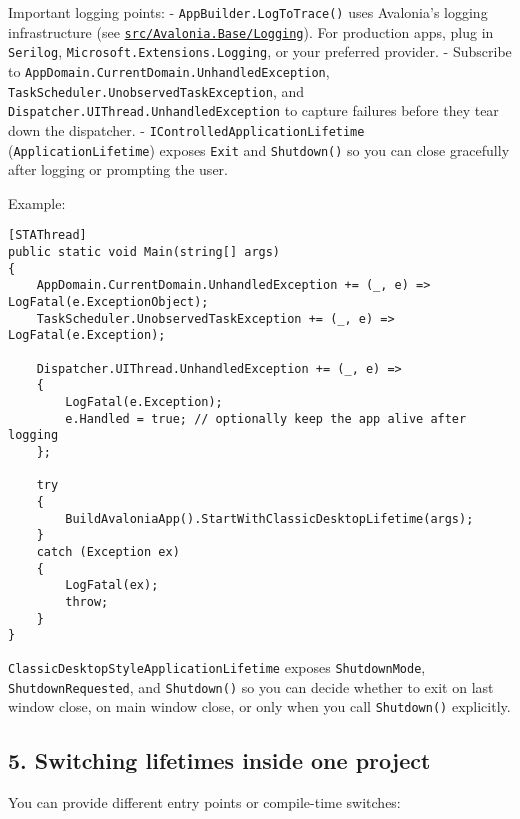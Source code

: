 Important logging points: -
\passthrough{\lstinline!AppBuilder.LogToTrace()!} uses Avalonia's
logging infrastructure (see
\href{https://github.com/AvaloniaUI/Avalonia/tree/master/src/Avalonia.Base/Logging}{\passthrough{\lstinline!src/Avalonia.Base/Logging!}}).
For production apps, plug in \passthrough{\lstinline!Serilog!},
\passthrough{\lstinline!Microsoft.Extensions.Logging!}, or your
preferred provider. - Subscribe to
\passthrough{\lstinline!AppDomain.CurrentDomain.UnhandledException!},
\passthrough{\lstinline!TaskScheduler.UnobservedTaskException!}, and
\passthrough{\lstinline!Dispatcher.UIThread.UnhandledException!} to
capture failures before they tear down the dispatcher. -
\passthrough{\lstinline!IControlledApplicationLifetime!}
(\passthrough{\lstinline!ApplicationLifetime!}) exposes
\passthrough{\lstinline!Exit!} and \passthrough{\lstinline!Shutdown()!}
so you can close gracefully after logging or prompting the user.

Example:

\begin{lstlisting}
[STAThread]
public static void Main(string[] args)
{
    AppDomain.CurrentDomain.UnhandledException += (_, e) => LogFatal(e.ExceptionObject);
    TaskScheduler.UnobservedTaskException += (_, e) => LogFatal(e.Exception);

    Dispatcher.UIThread.UnhandledException += (_, e) =>
    {
        LogFatal(e.Exception);
        e.Handled = true; // optionally keep the app alive after logging
    };

    try
    {
        BuildAvaloniaApp().StartWithClassicDesktopLifetime(args);
    }
    catch (Exception ex)
    {
        LogFatal(ex);
        throw;
    }
}
\end{lstlisting}

\passthrough{\lstinline!ClassicDesktopStyleApplicationLifetime!} exposes
\passthrough{\lstinline!ShutdownMode!},
\passthrough{\lstinline!ShutdownRequested!}, and
\passthrough{\lstinline!Shutdown()!} so you can decide whether to exit
on last window close, on main window close, or only when you call
\passthrough{\lstinline!Shutdown()!} explicitly.

\subsection{5. Switching lifetimes inside one
project}\label{switching-lifetimes-inside-one-project}

You can provide different entry points or compile-time switches:


